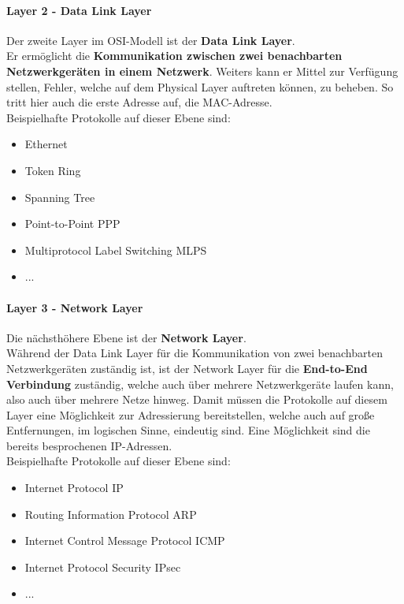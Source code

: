 \documentclass[12pt,a4paper]{report}
\begin{document}
\paragraph{Layer 2 - Data Link Layer}
Der zweite Layer im OSI-Modell ist der \textbf{Data Link Layer}.\\
Er ermöglicht die \textbf{Kommunikation zwischen zwei benachbarten Netzwerkgeräten in einem Netzwerk}. Weiters kann er Mittel zur Verfügung stellen, Fehler, welche auf dem Physical Layer auftreten können, zu beheben. So tritt hier auch die erste Adresse auf, die MAC-Adresse.\\

Beispielhafte Protokolle auf dieser Ebene sind:
\begin{itemize}
\item Ethernet
\item Token Ring
\item Spanning Tree 
\item Point-to-Point PPP
\item Multiprotocol Label Switching MLPS
\item ...
\end{itemize}
\paragraph{Layer 3 - Network Layer}
Die nächsthöhere Ebene ist der \textbf{Network Layer}.\\
Während der Data Link Layer für die Kommunikation von zwei benachbarten Netzwerkgeräten zuständig ist, ist der Network Layer für die \textbf{End-to-End Verbindung} zuständig, welche auch über mehrere Netzwerkgeräte laufen kann, also auch über mehrere Netze hinweg. Damit müssen die Protokolle auf diesem Layer eine Möglichkeit zur Adressierung bereitstellen, welche auch auf große Entfernungen, im logischen Sinne, eindeutig sind. Eine Möglichkeit sind die bereits besprochenen IP-Adressen.\\

Beispielhafte Protokolle auf dieser Ebene sind:
\begin{itemize}
\item Internet Protocol IP
\item Routing Information Protocol ARP
\item Internet Control Message Protocol ICMP
\item Internet Protocol Security IPsec
\item ...
\end{itemize}
\end{document}
